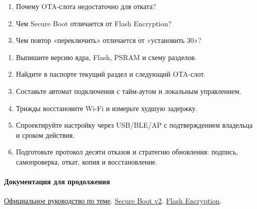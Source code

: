 \begin{selfcheck}
\begin{enumerate}
\item Почему OTA-слота недостаточно для отката?
\item Чем Secure Boot отличается от Flash Encryption?
\item Чем повтор «переключить» отличается от «установить 30»?
\end{enumerate}
\end{selfcheck}
\begin{tasks}
\begin{enumerate}
\item {} Выпишите версию ядра, Flash, PSRAM и схему разделов.
\item {} Найдите в паспорте текущий раздел и следующий OTA-слот.
\item {} Составьте автомат подключения с тайм-аутом и локальным управлением.
\item {} Трижды восстановите Wi-Fi и измерьте худшую задержку.
\item {} Спроектируйте настройку через USB/BLE/AP с подтверждением владельца и сроком действия.
\item {} Подготовьте протокол десяти отказов и стратегию обновления: подпись, самопроверка, откат, копия и восстановление.
\end{enumerate}
\end{tasks}

\paragraph{Документация для продолжения}\href{https://docs.espressif.com/projects/esp-idf/en/v5.4/esp32s3/api-reference/system/ota.html}{Официальное руководство по теме}.
\href{https://docs.espressif.com/projects/esp-idf/en/v5.4/esp32s3/security/secure-boot-v2.html}{Secure Boot v2}.
\href{https://docs.espressif.com/projects/esp-idf/en/v5.4/esp32s3/security/flash-encryption.html}{Flash Encryption}.
